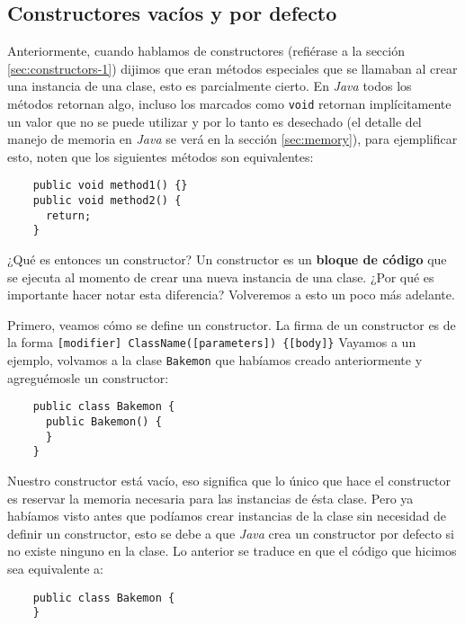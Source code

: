 \subsection{Constructores vacíos y por defecto}
  \label{sec:default-constructor}
  Anteriormente, cuando hablamos de constructores (refiérase a la sección 
  \ref{sec:constructors-1}) dijimos que eran métodos especiales que se llamaban al crear una 
  instancia de una clase, esto es parcialmente cierto.
  En \textit{Java} todos los métodos retornan algo, incluso los marcados como 
  \texttt{void} retornan implícitamente un valor que no se puede utilizar y por lo tanto
  es desechado (el detalle del manejo de memoria en \textit{Java} se verá en la sección 
  \ref{sec:memory}), para ejemplificar esto, noten que los siguientes métodos son equivalentes:
  
  \begin{verbatim}
    public void method1() {}
    public void method2() {
      return;
    }  
  \end{verbatim}

  ¿Qué es entonces un constructor?
  Un constructor es un \textbf{bloque de código} que se ejecuta al momento de crear una nueva 
  instancia de una clase.
  ¿Por qué es importante hacer notar esta diferencia?
  Volveremos a esto un poco más adelante.

  Primero, veamos cómo se define un constructor.
  La firma de un constructor es de la forma \texttt{[modifier] ClassName([parameters]) \{[body]\}}
  Vayamos a un ejemplo, volvamos a la clase \texttt{Bakemon} que habíamos creado anteriormente y 
  agreguémosle un constructor:
  
  \begin{verbatim}
    public class Bakemon {
      public Bakemon() {
      }
    }
  \end{verbatim}

  Nuestro constructor está vacío, eso significa que lo único que hace el constructor es reservar la 
  memoria necesaria para las instancias de ésta clase.
  Pero ya habíamos visto antes que podíamos crear instancias de la clase sin necesidad de definir un
  constructor, esto se debe a que \textit{Java} crea un constructor por defecto si no existe ninguno
  en la clase.
  Lo anterior se traduce en que el código que hicimos sea equivalente a:

  \begin{verbatim}
    public class Bakemon {
    }
  \end{verbatim}

